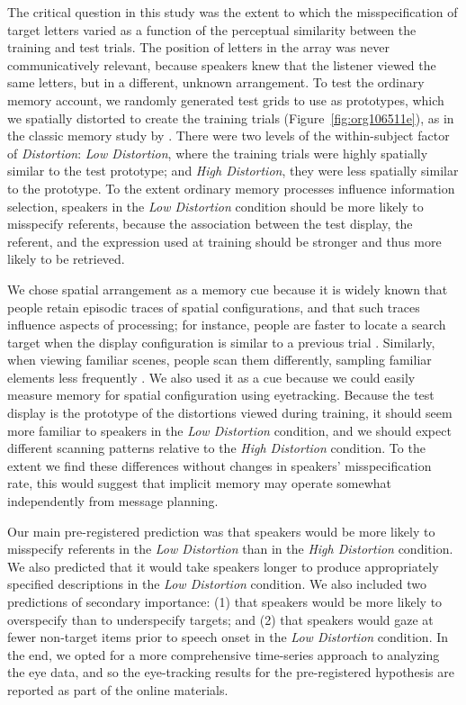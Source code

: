 \documentclass[natbib,doc,a4paper]{apa6}
\begin{document}
The critical question in this study was the extent to which the misspecification of target letters varied as a function of the perceptual similarity between the training and test trials. The position of letters in the array was never communicatively relevant, because speakers knew that the listener viewed the same letters, but in a different, unknown arrangement. To test the ordinary memory account, we randomly generated test grids to use as prototypes, which we spatially distorted to create the training trials (Figure~\ref{fig:org106511e}), as in the classic memory study by \cite{posner_keele_1968}. There were two levels of the within-subject factor of \emph{Distortion}: \emph{Low Distortion}, where the training trials were highly spatially similar to the test prototype; and \emph{High Distortion}, they were less spatially similar to the prototype. To the extent ordinary memory processes influence information selection, speakers in the \emph{Low Distortion} condition should be more likely to misspecify referents, because the association between the test display, the referent, and the expression used at training should be stronger and thus more likely to be retrieved.

We chose spatial arrangement as a memory cue because it is widely known that people retain episodic traces of spatial configurations, and that such traces influence aspects of processing; for instance, people are faster to locate a search target when the display configuration is similar to a previous trial \citep{chun_jiang_1998}.  Similarly, when viewing familiar scenes, people scan them differently, sampling familiar elements less frequently \citep{ryan2000amnesia}.  We also used it as a cue because we could easily measure memory for spatial configuration using eyetracking. Because the test display is the prototype of the distortions viewed during training, it should seem more familiar to speakers in the \emph{Low Distortion} condition, and we should expect different scanning patterns relative to the \emph{High Distortion} condition. To the extent we find these differences without changes in speakers' misspecification rate, this would suggest that implicit memory may operate somewhat independently from message planning.

Our main pre-registered prediction was that speakers would be more likely to misspecify referents in the \emph{Low Distortion} than in the \emph{High Distortion} condition. We also predicted that it would take speakers longer to produce appropriately specified descriptions in the \emph{Low Distortion} condition. We also included two predictions of secondary importance: (1) that speakers would be more likely to overspecify than to underspecify targets; and (2) that speakers would gaze at fewer non-target items prior to speech onset in the \emph{Low Distortion} condition. In the end, we opted for a more comprehensive time-series approach to analyzing the eye data, and so the eye-tracking results for the pre-registered hypothesis are reported as part of the online materials.
\end{document}
